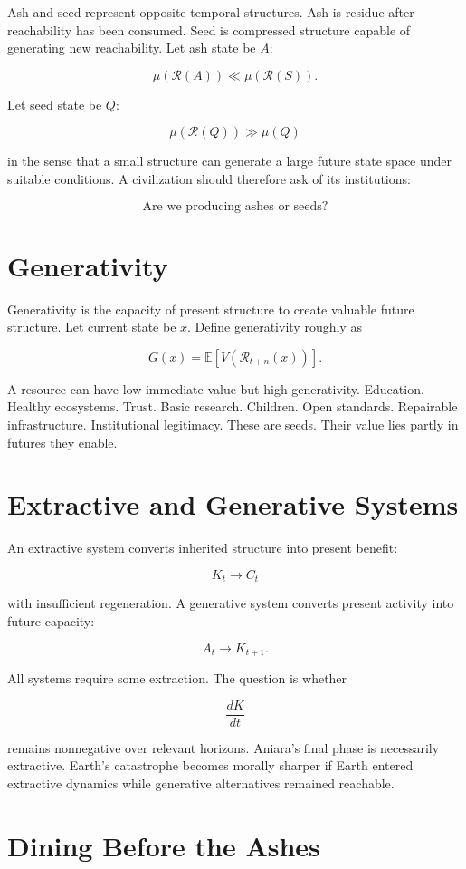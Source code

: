 \documentclass[11pt,oneside]{book}
\theoremstyle{definition}
\theoremstyle{remark}
\newcommand{\R}{\mathcal{R}}
\begin{document}
Ash and seed represent opposite temporal structures. Ash is residue after reachability has been
consumed. Seed is compressed structure capable of generating new reachability. Let ash state be
\(A\):

\[
\mu(\R(A))\ll\mu(\R(S)).
\]

Let seed state be \(Q\):

\[
\mu(\R(Q)) \gg \mu(Q)
\]

in the sense that a small structure can generate a large future state space under suitable
conditions. A civilization should therefore ask of its institutions:

\[
\text{Are we producing ashes or seeds?}
\]

\section{Generativity}

Generativity is the capacity of present structure to create valuable future structure. Let current
state be \(x\). Define generativity roughly as

\[
G(x) = \mathbb E[ V(\R_{t+n}(x)) ].
\]

A resource can have low immediate value but high generativity. Education. Healthy ecosystems. Trust.
Basic research. Children. Open standards. Repairable infrastructure. Institutional legitimacy. These
are seeds. Their value lies partly in futures they enable.

\section{Extractive and Generative Systems}

An extractive system converts inherited structure into present benefit:

\[
K_t\rightarrow C_t
\]

with insufficient regeneration. A generative system converts present activity into future capacity:

\[
A_t\rightarrow K_{t+1}.
\]

All systems require some extraction. The question is whether

\[
\frac{dK}{dt}
\]

remains nonnegative over relevant horizons. Aniara's final phase is necessarily extractive. Earth's
catastrophe becomes morally sharper if Earth entered extractive dynamics while generative
alternatives remained reachable.

\section{Dining Before the Ashes}
\end{document}

